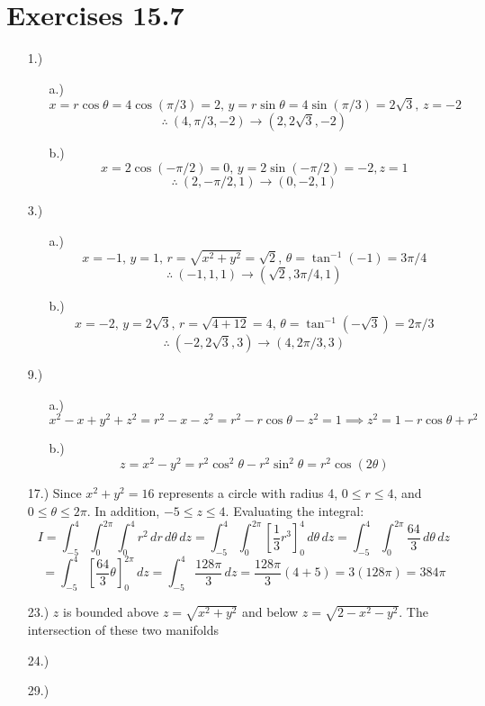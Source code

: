 \documentclass[12pt]{article}
\newcommand{\bracks}[1]{\left[#1\right]}
\begin{document}
\section*{Exercises 15.7}
\begin{itemize}
    \item [1.)] \begin{itemize}
        \item [a.)] \[x=r\cos\theta=4\cos(\pi/3)=2,\,y=r\sin\theta=4\sin(\pi/3)=2\sqrt3,\,z=-2\]
        \[\therefore\ (4,\pi/3,-2)\to(2,2\sqrt3,-2)\]

        \item [b.)] \[x=2\cos(-\pi/2)=0,\,y=2\sin(-\pi/2)=-2,z=1\]
        \[\therefore\ (2,-\pi/2,1)\to(0,-2,1)\]
    \end{itemize}

    \item [3.)] \begin{itemize}
        \item [a.)] \[x=-1,\,y=1,\,r=\sqrt{x^2+y^2}=\sqrt{2},\,\theta=\tan^{-1}(-1)=3\pi/4\]
        \[\therefore\ (-1,1,1)\to(\sqrt2,3\pi/4,1)\]

        \item [b.)] \[x=-2,\,y=2\sqrt3,\,r=\sqrt{4+12}=4,\,\theta=\tan^{-1}(-\sqrt3)=2\pi/3\]
        \[\therefore\ (-2,2\sqrt3,3)\to(4,2\pi/3,3)\]
    \end{itemize}

    \item [9.)] \begin{itemize}
        \item [a.)] \[x^2-x+y^2+z^2=r^2-x-z^2=r^2-r\cos\theta-z^2=1\implies z^2=1-r\cos\theta+r^2\]

        \item [b.)] \[z=x^2-y^2=r^2\cos^2\theta-r^2\sin^2\theta=r^2\cos(2\theta)\]
    \end{itemize}

    \item [17.)] Since $x^2+y^2=16$ represents a circle with radius 4, $0\leq r\leq4$, and $0\leq\theta\leq2\pi$. In addition, $-5\leq z\leq4$. Evaluating the integral:
    \[I=\int^4_{-5}\int^{2\pi}_0\int^4_0r^2\,dr\,d\theta\,dz=\int^4_{-5}\int^{2\pi}_0\bracks{\frac{1}{3}r^3}^4_0\,d\theta\,dz=\int^4_{-5}\int^{2\pi}_0\frac{64}{3}\,d\theta\,dz\]
    \[=\int^4_{-5}\bracks{\frac{64}{3}\theta}^{2\pi}_0\,dz=\int^4_{-5}\frac{128\pi}{3}\,dz=\frac{128\pi}{3}(4+5)=3(128\pi)=384\pi\]

    \item [23.)] $z$ is bounded above $z=\sqrt{x^2+y^2}$ and below $z=\sqrt{2-x^2-y^2}$. The intersection of these two manifolds

    \item [24.)]

    \item [29.)]

\end{itemize}
\end{document}
